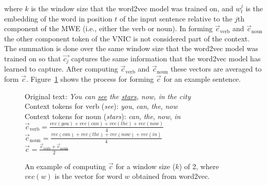 \documentclass[11pt]{article}
\newcommand{\figref}[1]{Figure~\ref{#1}}
\newcommand{\VNIC}{VNIC\xspace}
\begin{document}
\noindent
where $k$ is the window size that the word2vec model was trained on,
and $w^j_t$ is the embedding of the word in position $t$ of the input
sentence relative to the $j$th component of the MWE (i.e., either the
verb or noun). In forming $\vec{c}_\mathrm{verb}$ and
$\vec{c}_\mathrm{noun}$ the other component token of the \VNIC is not
considered part of the context. The summation is done over the same
window size that the word2vec model was trained on so that $\vec{c_j}$
captures the same information that the word2vec model has learned to
capture. After computing $\vec{c}_\mathrm{verb}$ and
$\vec{c}_\mathrm{noun}$ these vectors are averaged to form
$\vec{c}$. \figref{fig:features} shows the process for forming
$\vec{c}$ for an example sentence.

\begin{figure}
Original text: \emph{You can \underline{see} the \underline{stars},
  now, in the city}\\

Context tokens for verb (\emph{see}): \emph{you}, \emph{can},
\emph{the}, \emph{now}\\

Context tokens for noun (\emph{stars}): \emph{can}, \emph{the},
\emph{now}, \emph{in}\\

$\vec{c}_\mathrm{verb} = \frac{vec(you) + vec(can) + vec(the)+ vec(now)}{4}$\\

$\vec{c}_\mathrm{noun} = \frac{vec(can) + vec(the)+ vec(now) + vec(in)}{4}$\\

$\vec{c} = \frac{\vec{c}_\mathrm{verb} + \vec{c}_\mathrm{noun}}{2}$


\caption{An example of computing $\vec{c}$ for a window size ($k$) of
  2, where $vec(w)$ is the vector for word $w$ obtained from
  word2vec.\label{fig:features}}
\end{figure}






\end{document}
